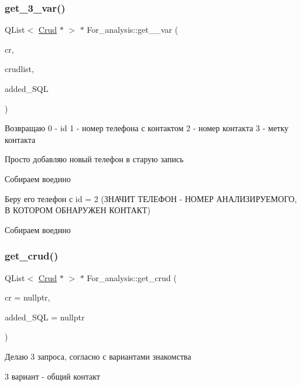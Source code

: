 \subsubsection{\texorpdfstring{get\_3\_var()}{get\_3\_var()}}
{\footnotesize\ttfamily Q\+List$<$ \mbox{\hyperlink{class_crud}{Crud}} $\ast$ $>$ $\ast$ For\+\_\+analysis\+::get\+\_\+\_\+var (\begin{DoxyParamCaption}\item[{\mbox{\hyperlink{class_crud}{Crud}} $\ast$}]{cr,  }\item[{Q\+List$<$ \mbox{\hyperlink{class_crud}{Crud}} $\ast$ $>$ $\ast$}]{crudlist,  }\item[{Q\+String}]{added\+\_\+\+S\+QL }\end{DoxyParamCaption})}

Возвращаю 0 -\/ id 1 -\/ номер телефона с контактом 2 -\/ номер контакта 3 -\/ метку контакта

Просто добавляю новый телефон в старую запись

Собираем воедино

Беру его телефон с id = 2 (ЗНАЧИТ ТЕЛЕФОН -\/ НОМЕР АНАЛИЗИРУЕМОГО, В КОТОРОМ ОБНАРУЖЕН КОНТАКТ)

Собираем воедино \mbox{\label{class_for__analysis_a80f0d4137f297ab56b6251c64e089a6e}} 
\subsubsection{\texorpdfstring{get\_crud()}{get\_crud()}}
{\footnotesize\ttfamily Q\+List$<$ \mbox{\hyperlink{class_crud}{Crud}} $\ast$ $>$ $\ast$ For\+\_\+analysis\+::get\+\_\+crud (\begin{DoxyParamCaption}\item[{\mbox{\hyperlink{class_crud}{Crud}} $\ast$}]{cr = {\ttfamily nullptr},  }\item[{Q\+String}]{added\+\_\+\+S\+QL = {\ttfamily nullptr} }\end{DoxyParamCaption})}

Делаю 3 запроса, согласно с вариантами знакомства

3 вариант -\/ общий контакт \mbox{\label{class_for__analysis_a99f0ecf9d9f7d239d042953776f2be18}} 
